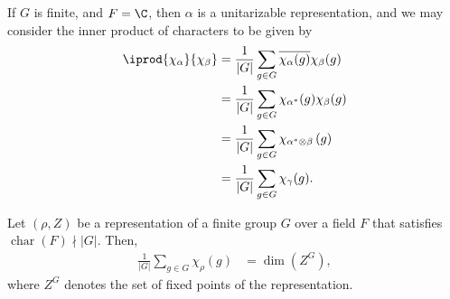 \documentclass[10pt]{mypackage}
\begin{document}
If $G$ is finite, and $F = \C$, then $\alpha$ is a unitarizable representation, and we may consider the inner product of characters to be given by
\begin{align*}
  \iprod{\chi_{\alpha}}{\chi_{\beta}} &= \frac{1}{\left\vert G \right\vert}\sum_{g\in G} \overline{\chi_{\alpha}(g)}\chi_{\beta}(g)\\
                                      &= \frac{1}{\left\vert G \right\vert}\sum_{g\in G} \chi_{\alpha^{\ast}}(g)\chi_{\beta}(g)\\
                                      &= \frac{1}{\left\vert G \right\vert}\sum_{g\in G} \chi_{\alpha^{\ast}\otimes\beta}\left( g \right)\\
                                      &= \frac{1}{\left\vert G \right\vert}\sum_{g\in G} \chi_{\gamma}(g).
\end{align*}
\begin{lemma}
  Let $\left( \rho,Z \right)$ be a representation of a finite group $G$ over a field $F$ that satisfies $\operatorname{char}(F)\nmid \left\vert G \right\vert$. Then,
  \begin{align*}
    \frac{1}{\left\vert G \right\vert}\sum_{g\in G}\chi_{\rho}(g) &= \dim\left( Z^{G} \right),
  \end{align*}
  where $Z^{G}$ denotes the set of fixed points of the representation.
\end{lemma}
\end{document}
